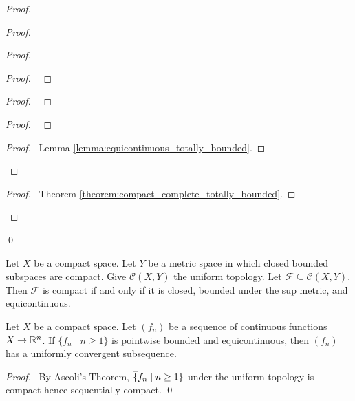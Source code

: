 \begin{proof}
\begin{proof}
        \begin{proof}
            \begin{proof}
                \pf\ 
            \end{proof}
            \begin{proof}
                \pf\ 
            \end{proof}
            \begin{proof}
                \pf\ 
            \end{proof}
            \begin{proof}
                \pf\ Lemma \ref{lemma:equicontinuous_totally_bounded}.
            \end{proof}
        \end{proof}
        \begin{proof}
            \pf\ Theorem \ref{theorem:compact_complete_totally_bounded}.
        \end{proof}
    \end{proof}
    \qed
\end{proof}

\begin{corollary}
    Let $X$ be a compact space. Let $Y$ be a metric space in which closed bounded subspaces are compact.
    Give $\mathcal{C}(X, Y)$ the uniform topology.
    Let $\mathcal{F} \subseteq \mathcal{C}(X, Y)$. Then $\mathcal{F}$ is compact if and only if it is closed, bounded under the
    sup metric, and equicontinuous.
\end{corollary}

\begin{theorem}
    Let $X$ be a compact space. Let $(f_n)$ be a sequence of continuous functions $X \rightarrow \mathbb{R}^n$. If $\{f_n \mid n \geq 1 \}$
    is pointwise bounded and equicontinuous, then $(f_n)$ has a uniformly convergent subsequence.
\end{theorem}

\begin{proof}
    \pf\ By Ascoli's Theorem, $\overline\{f_n \mid n \geq 1 \}$ under the uniform topology is compact hence sequentially compact. \qed
\end{proof}

